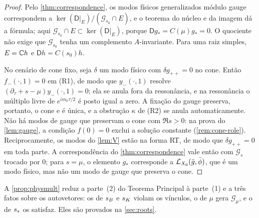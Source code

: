 \begin{proof}
Pelo \cref{thm:correspondence}, os modos físicos generalizados módulo gauge correspondem a
$\ker(\mathsf D|_E)/(\mathcal G_{s_0}\cap E)$, e o teorema do núcleo e da imagem dá a fórmula; aqui $\mathcal G_{s_0}\cap E\subset\ker(\mathsf D|_E)$,
porque $\mathsf Dg_*=C(\mu)g_*=0$. O quociente não
exige que $\mathcal G_{s_0}$ tenha um complemento $A$-invariante. Para uma raiz simples, $E=\mathbb{C} h$ e
$\mathsf Dh=C(s_0)h$.

No cenário de cone fixo, seja $\delta$ um modo físico com $\delta g_{++}=0$ no cone. Então
$f_-(\cdot,1)=0$ em (R1), de modo que $y_-(\cdot,1)$ resolve $(\partial_\tau+s-\mu)y_-(\cdot,1)=0$; ela se anula fora da
ressonância, e na ressonância o múltiplo livre de $e^{im_0\tau/2}$ é posto igual a zero. A fixação do gauge
preserva, portanto, o cone e é única, e a obstrução $\kappa$ de (R2) se anula automaticamente. Não
há modos de gauge que preservam o cone com $\Re s>0$: na prova do \cref{lem:gauge}, a condição
$f(0)=0$ exclui a solução constante (\cref{rem:cone-role}). Reciprocamente, os modos do \cref{lem:V} estão na
forma RT, de modo que $\delta g_{++}=0$ em toda parte. A correspondência do \cref{thm:correspondence} vale então com
$\mathcal G_s$ trocado por $0$; para $s=\mu$, o elemento $g_*$ corresponde a $\mathcal{L}_{X_0}(\bar g,\bar\phi)$,
que é um modo físico, mas não um modo de gauge que preserva o cone.
\end{proof}

A \cref{prop:physmult} reduz a parte~(2) do Teorema Principal à parte~(1) e a três fatos sobre os
autovetores: os de $s_{B}$ e $s_{K}$ violam os vínculos, o de $\mu$ gera $\mathcal G_\mu$, e o
de $s_{\ast}$ os satisfaz. Eles são provados na \cref{sec:roots}.
